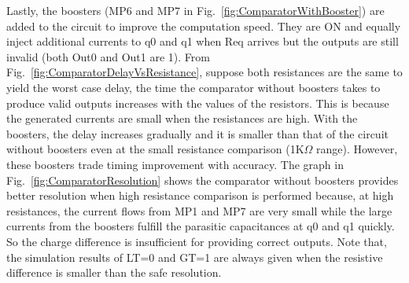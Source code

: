 \documentclass[twocolumn,conference]{IEEEtran}
\begin{document}
Lastly, the boosters \cite{Zhou-2006-ISVLSI} (MP6 and MP7 in Fig.~\ref{fig:ComparatorWithBooster}) are added to the circuit to improve the computation speed. They are ON and equally inject additional currents to q0 and q1 when Req arrives but the outputs are still invalid (both Out0 and Out1 are 1). From Fig.~\ref{fig:ComparatorDelayVsResistance}, suppose both resistances are the same to yield the worst case delay, the time the comparator without boosters takes to produce valid outputs increases with the values of the resistors. This is because the generated currents are small when the resistances are high. With the boosters, the delay increases gradually and it is smaller than that of the circuit without boosters even at the small resistance comparison (1K$\Omega$ range). However, these boosters trade timing improvement with accuracy. The graph in Fig.~\ref{fig:ComparatorResolution} shows the comparator without boosters provides better resolution when high resistance comparison is performed because, at high resistances, the current flows from MP1 and MP7 are very small while the large currents from the boosters fulfill the parasitic capacitances at q0 and q1 quickly. So the charge difference is insufficient for providing correct outputs. Note that, the simulation results of LT=0 and GT=1 are always given when the resistive difference is smaller than the safe resolution.
\end{document}
